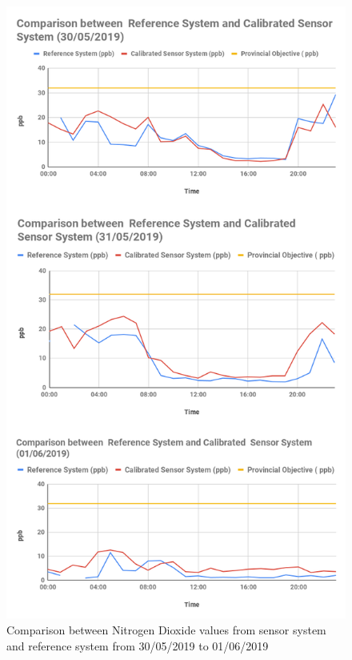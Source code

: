 \begin{figure}[h]
  \begin{center}
  \includegraphics[scale=0.45]{images/figure106.png}
  \end{center}
  \caption{Comparison between Nitrogen Dioxide values from sensor system and reference system from 30/05/2019 to 01/06/2019}
\label{Nitrogen}

\end{figure}
\clearpage

